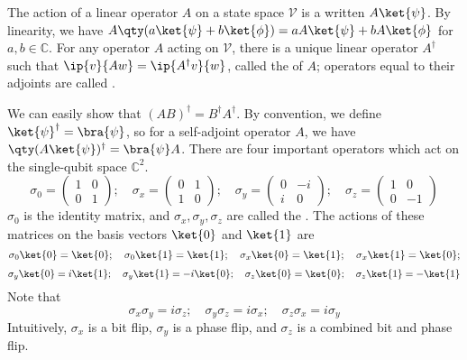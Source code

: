 The action of a linear operator $A$ on a state space $\mathcal V$ is a written $A \ket{\psi}$.
By linearity, we have $A \qty(a \ket{\psi} + b \ket{\phi}) = a A \ket{\psi} + b A \ket{\phi}$ for $a, b \in \mathbb C$.
For any operator $A$ acting on $\mathcal V$, there is a unique linear operator $A^\dagger$ such that $\ip{v}{Aw} = \ip{A^\dagger v}{w}$, called the  of $A$; operators equal to their adjoints are called .

We can easily show that $(AB)^\dagger = B^\dagger A^\dagger$.
By convention, we define $\ket{\psi}^\dagger = \bra{\psi}$, so for a self-adjoint operator $A$, we have $\qty(A \ket{\psi})^\dagger = \bra{\psi} A$.
There are four important operators which act on the single-qubit space $\mathbb C^2$.
\[ \sigma_0 = \begin{pmatrix}
    1 & 0 \\
    0 & 1
\end{pmatrix};\quad \sigma_x = \begin{pmatrix}
    0 & 1 \\
    1 & 0
\end{pmatrix};\quad \sigma_y = \begin{pmatrix}
    0 & -i \\
    i & 0
\end{pmatrix};\quad \sigma_z = \begin{pmatrix}
    1 & 0 \\
    0 & -1
\end{pmatrix} \]
$\sigma_0$ is the identity matrix, and $\sigma_x, \sigma_y, \sigma_z$ are called the .
The actions of these matrices on the basis vectors $\ket{0}$ and $\ket{1}$ are
\[ \sigma_0\ket{0} = \ket{0};\quad \sigma_0\ket{1} = \ket{1};\quad \sigma_x\ket{0} = \ket{1};\quad \sigma_x\ket{1} = \ket{0}; \]
\[ \sigma_y\ket{0} = i\ket{1};\quad \sigma_y\ket{1} = -i\ket{0};\quad \sigma_z\ket{0} = \ket{0};\quad \sigma_z\ket{1} = -\ket{1} \]
Note that
\[ \sigma_x \sigma_y = i \sigma_z;\quad \sigma_y \sigma_z = i \sigma_x;\quad \sigma_z \sigma_x = i\sigma_y \]
Intuitively, $\sigma_x$ is a bit flip, $\sigma_y$ is a phase flip, and $\sigma_z$ is a combined bit and phase flip.

